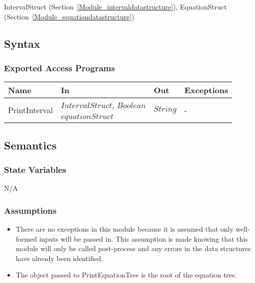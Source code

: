 \documentclass[12pt, titlepage]{article}
\begin{document}
IntervalStruct (Section~\ref{Module_intervaldatastructure}), EquationStruct 
(Section~\ref{Module_equationdatastructure})

\subsection{Syntax}

\subsubsection{Exported Access Programs}

\begin{center}
	\begin{tabular}{p{3.1cm} p{3cm} p{3cm} p{5cm}}
		\hline
		\textbf{Name} & \textbf{In} & \textbf{Out} & \textbf{Exceptions} \\
		\hline
		\multirow{2}{3.1cm}{PrintInterval} & $IntervalStruct$, $Boolean$ & 
		\multirow{2}{3cm}{$String$} & \multirow{2}{5cm}{-} \\
		PrintEquationTree & $equationStruct$ & $String$ & - \\
		\hline
	\end{tabular}
\end{center}

\subsection{Semantics}

\subsubsection{State Variables}

N/A

\subsubsection{Assumptions}

\begin{itemize}
	\item There are no exceptions in this module because it is assumed that 
	only well-formed inputs will be passed in. This assumption is made knowing 
	that this module will only be called post-process and any errors in the 
	data structures have already been identified.
	\item The object passed to PrintEquationTree is the root of the equation 
	tree.
\end{itemize}
\end{document}
